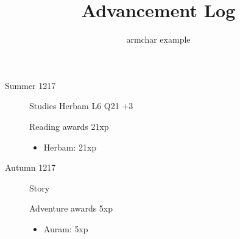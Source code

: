\documentclass{scrartcl}
\title{Advancement Log}
\author{armchar example}
\begin{document}
\maketitle
\begin{description}
  \item[Summer 1217]
    Studies Herbam L6 Q21 +3

    Reading awards 21xp
    \begin{itemize}
      \item Herbam: 21xp
    \end{itemize}
  \item[Autumn 1217]
    Story

    Adventure awards 5xp
    \begin{itemize}
      \item Auram: 5xp
    \end{itemize}
\end{description}
\end{document}
